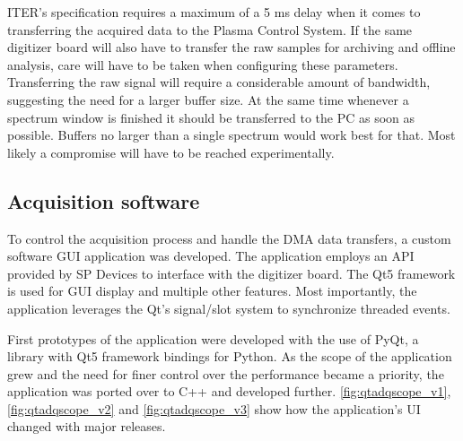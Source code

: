 ITER's specification requires a maximum of a 5 ms delay when it comes
to transferring the acquired data to the Plasma Control System.
If the same digitizer board will also have to transfer the raw
samples for archiving and offline analysis, care will have to 
be taken when configuring these parameters. Transferring the raw signal
will require a considerable amount of bandwidth, suggesting the need for a larger
buffer size. At the same time whenever a spectrum window is finished
it should be transferred to the PC as soon as possible.
Buffers no larger than a single spectrum would work best for that.
Most likely a compromise will have to be reached experimentally.

\subsection{Acquisition software}

To control the acquisition process and handle the DMA data transfers,
a custom software GUI application was developed. The application
employs an API provided by SP Devices to interface with the digitizer board.
The Qt5 framework is used for GUI display and multiple other features.
Most importantly, the application leverages the Qt's signal/slot system 
to synchronize threaded events.


First prototypes of the application were developed with the use of PyQt, 
a library with Qt5 framework bindings for Python.
As the scope of the application grew
and the need for finer control over the performance became a priority,
the application was ported over to C++ and developed further.
\autoref{fig:qtadqscope_v1}, \autoref{fig:qtadqscope_v2} and
\autoref{fig:qtadqscope_v3} show how the application's UI 
changed with major releases.

